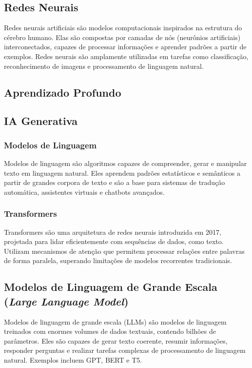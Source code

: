 \subsection{Redes Neurais}

Redes neurais artificiais são modelos computacionais inspirados na estrutura do cérebro humano. Elas são compostas por camadas de nós (neurônios artificiais) interconectados, capazes de processar informações e aprender padrões a partir de exemplos. Redes neurais são amplamente utilizadas em tarefas como classificação, reconhecimento de imagens e processamento de linguagem natural.

\subsection{Aprendizado Profundo}

\subsection{IA Generativa}
\subsubsection{Modelos de Linguagem}

Modelos de linguagem são algoritmos capazes de compreender, gerar e manipular texto em linguagem natural. Eles aprendem padrões estatísticos e semânticos a partir de grandes corpora de texto e são a base para sistemas de tradução automática, assistentes virtuais e chatbots avançados.

\subsubsection{Transformers}

Transformers são uma arquitetura de redes neurais introduzida em 2017, projetada para lidar eficientemente com sequências de dados, como texto. Utilizam mecanismos de atenção que permitem processar relações entre palavras de forma paralela, superando limitações de modelos recorrentes tradicionais.

\subsection{Modelos de Linguagem de Grande Escala (\emph{Large Language Model})}

Modelos de linguagem de grande escala (LLMs) são modelos de linguagem treinados com enormes volumes de dados textuais, contendo bilhões de parâmetros. Eles são capazes de gerar texto coerente, resumir informações, responder perguntas e realizar tarefas complexas de processamento de linguagem natural. Exemplos incluem GPT, BERT e T5.
